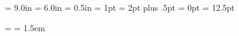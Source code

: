 
\vsize            = 9.0in
\hsize            = 6.0in
\voffset          = 0.5in
\lineskiplimit    = 1pt
\lineskip         = 2pt plus .5pt
\parindent        = 0pt
\baselineskip     = 12.5pt

\parskip          = \baselineskip
\emergencystretch = 1.5em
